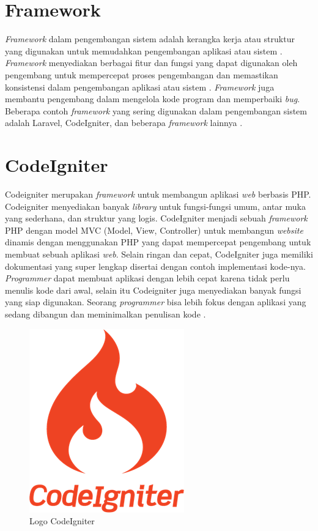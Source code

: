 \section{Framework}
\textit{Framework} dalam pengembangan sistem adalah kerangka kerja atau struktur yang digunakan untuk memudahkan pengembangan aplikasi atau sistem \cite{sallaby2020perancangan}. \textit{Framework} menyediakan berbagai fitur dan fungsi yang dapat digunakan oleh pengembang untuk mempercepat proses pengembangan dan memastikan konsistensi dalam pengembangan aplikasi atau sistem \cite{simanullang2021sistem}. \textit{Framework} juga membantu pengembang dalam mengelola kode program dan memperbaiki \textit{bug}. Beberapa contoh \textit{framework} yang sering digunakan dalam pengembangan sistem adalah Laravel, CodeIgniter, dan beberapa \textit{framework} lainnya \cite{Fadllullah2022PengembanganSI}.

\section{CodeIgniter}
Codeigniter merupakan \textit{framework} untuk membangun aplikasi \textit{web} berbasis PHP. Codeigniter menyediakan banyak \textit{library} untuk fungsi-fungsi umum, antar muka yang sederhana, dan struktur yang logis. CodeIgniter menjadi sebuah \textit{framework} PHP dengan model MVC (Model, View, Controller) untuk membangun \textit{website} dinamis dengan menggunakan PHP yang dapat mempercepat pengembang untuk membuat sebuah aplikasi \textit{web}. Selain ringan dan cepat, CodeIgniter juga memiliki dokumentasi yang super lengkap disertai dengan contoh implementasi kode-nya. \textit{Programmer} dapat membuat aplikasi dengan lebih cepat karena tidak perlu menulis kode dari awal, selain itu Codeigniter juga menyediakan banyak fungsi yang siap digunakan. Seorang \textit{programmer} bisa lebih fokus dengan aplikasi yang sedang dibangun dan meminimalkan penulisan kode \cite{tyowati2017implementasi}.

\begin{figure}
	\centering
	\includegraphics[width=0.20\linewidth]{konten//gambar/logo-codeigniter.png}
	\caption{Logo CodeIgniter}
	\label{fig:enter-label}
\end{figure}

